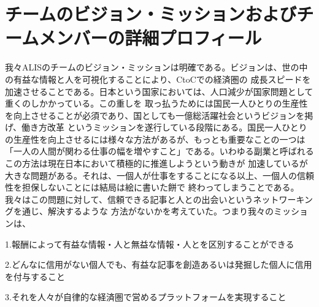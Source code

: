 \documentclass{jsarticle}
\begin{document}
\section{チームのビジョン・ミッションおよびチームメンバーの詳細プロフィール}
我々ALISのチームのビジョン・ミッションは明確である。ビジョンは、世の中の有益な情報と人を可視化することにより、CtoCでの経済圏の
成長スピードを加速させることである。日本という国家においては、人口減少が国家問題として重くのしかかっている。この重しを
取っ払うためには国民一人ひとりの生産性を向上させることが必須であり、国としても一億総活躍社会というビジョンを掲げ、働き方改革
というミッションを遂行している段階にある。国民一人ひとりの生産性を向上させるには様々な方法があるが、もっとも重要なことの一つは
「一人の人間が関わる仕事の幅を増やすこと」である。いわゆる副業と呼ばれるこの方法は現在日本において積極的に推進しようという動きが
加速しているが大きな問題がある。それは、一個人が仕事をすることになる以上、一個人の信頼性を担保しないことには結局は絵に書いた餅で
終わってしまうことである。我々はこの問題に対して、信頼できる記事と人との出会いというネットワーキングを通じ、解決するような
方法がないかを考えていた。つまり我々のミッションは、

1.報酬によって有益な情報・人と無益な情報・人とを区別することができる

2.どんなに信用がない個人でも、有益な記事を創造あるいは発掘した個人に信用を付与すること

3.それを人々が自律的な経済圏で営めるプラットフォームを実現すること
\end{document}
